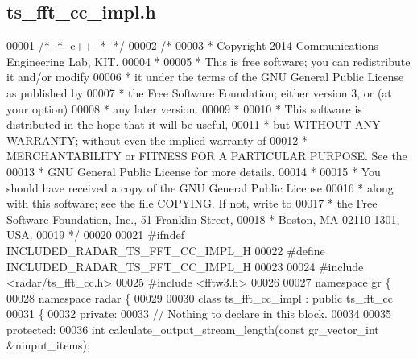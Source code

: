 \subsection{ts\+\_\+fft\+\_\+cc\+\_\+impl.\+h}
\label{ts__fft__cc__impl_8h_source}

\begin{DoxyCode}
00001 \textcolor{comment}{/* -*- c++ -*- */}
00002 \textcolor{comment}{/* }
00003 \textcolor{comment}{ * Copyright 2014 Communications Engineering Lab, KIT.}
00004 \textcolor{comment}{ * }
00005 \textcolor{comment}{ * This is free software; you can redistribute it and/or modify}
00006 \textcolor{comment}{ * it under the terms of the GNU General Public License as published by}
00007 \textcolor{comment}{ * the Free Software Foundation; either version 3, or (at your option)}
00008 \textcolor{comment}{ * any later version.}
00009 \textcolor{comment}{ * }
00010 \textcolor{comment}{ * This software is distributed in the hope that it will be useful,}
00011 \textcolor{comment}{ * but WITHOUT ANY WARRANTY; without even the implied warranty of}
00012 \textcolor{comment}{ * MERCHANTABILITY or FITNESS FOR A PARTICULAR PURPOSE.  See the}
00013 \textcolor{comment}{ * GNU General Public License for more details.}
00014 \textcolor{comment}{ * }
00015 \textcolor{comment}{ * You should have received a copy of the GNU General Public License}
00016 \textcolor{comment}{ * along with this software; see the file COPYING.  If not, write to}
00017 \textcolor{comment}{ * the Free Software Foundation, Inc., 51 Franklin Street,}
00018 \textcolor{comment}{ * Boston, MA 02110-1301, USA.}
00019 \textcolor{comment}{ */}
00020  
00021 \textcolor{preprocessor}{#ifndef INCLUDED\_RADAR\_TS\_FFT\_CC\_IMPL\_H}
00022 \textcolor{preprocessor}{#define INCLUDED\_RADAR\_TS\_FFT\_CC\_IMPL\_H}
00023 
00024 \textcolor{preprocessor}{#include <radar/ts_fft_cc.h>}
00025 \textcolor{preprocessor}{#include <fftw3.h>}
00026 
00027 \textcolor{keyword}{namespace }gr \{
00028   \textcolor{keyword}{namespace }radar \{
00029 
00030     \textcolor{keyword}{class }ts_fft_cc_impl : \textcolor{keyword}{public} ts_fft_cc
00031     \{
00032      \textcolor{keyword}{private}:
00033       \textcolor{comment}{// Nothing to declare in this block.}
00034 
00035      \textcolor{keyword}{protected}:
00036       \textcolor{keywordtype}{int} calculate_output_stream_length(\textcolor{keyword}{const} gr\_vector\_int &ninput\_items);

\end{DoxyCode}
